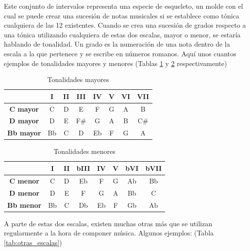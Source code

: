 Este conjunto de intervalos representa una especie de esqueleto, un molde con el cual se puede crear una sucesión de notas musicales si se establece como tónica cualquiera de las 12 existentes. Cuando se crea una sucesión de grados respecto a una tónica utilizando cualquiera de estas dos escalas, mayor o menor, se estaría hablando de tonalidad. Un grado es la numeración de una nota dentro de la escala a la que pertenece y se escribe en números romanos. Aquí unos cuantos ejemplos de tonalidades mayores y menores (Tablas \ref{tab:tonalidades_mayores} y \ref{tab:tonalidades_menores} respectivamente)

\begin{table}[h]
    \centering
    \begin{tabular}{c|c|c|c|c|c|c|c}
     & \textbf{I}& \textbf{II} & \textbf{III} & \textbf{IV} & \textbf{V} & \textbf{VI} & \textbf{VII} \\
        \hline
        \hline
        \textbf{C mayor} & C & D & E & F & G & A & B \\
        \hline
        \textbf{D mayor} & D & E & F\# & G & A & B & C\# \\
        \hline
        \textbf{Bb mayor} & Bb & C & D & Eb & F & G & A \\
    \end{tabular}
    \caption{Tonalidades mayores}
    \label{tab:tonalidades_mayores}
\end{table}

\begin{table}[h]
    \centering
    \begin{tabular}{c|c|c|c|c|c|c|c}
        & \textbf{I} & \textbf{II} & \textbf{bIII} & \textbf{IV} & \textbf{V} & \textbf{bVI} & \textbf{bVII} \\
        \hline
        \hline
        \textbf{C menor} & C & D & Eb & F & G & Ab & Bb \\
        \hline
        \textbf{D menor} & D & E & F & G & A & Bb & C \\
        \hline
        \textbf{Bb menor} & Bb & C & Db & Eb & F & Gb & Ab \\
    \end{tabular}
    \caption{Tonalidades menores}
    \label{tab:tonalidades_menores}
\end{table}

A parte de estas dos escalas, existen muchas otras más que se utilizan regularmente a la hora de componer música. Algunos ejemplos: (Tabla \ref{tab:otras_escalas})

